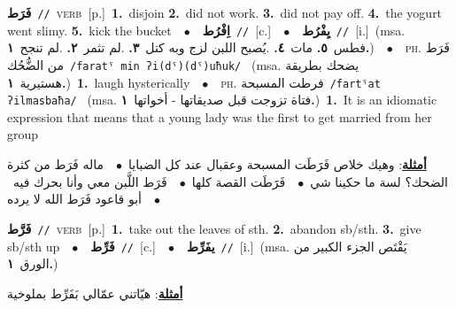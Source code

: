\documentclass[10pt,a4paper,twoside]{article} %
\begin{document}
\begin{multicols}{2}
{\setlength\topsep{0pt}\textbf{\foreignlanguage{arabic}{فَرَط}}\ {\color{gray}\texttt{//}\color{black}}\ \textsc{verb}\ [p.]\ \textbf{1.}~disjoin  \textbf{2.}~did not work.  \textbf{3.}~did not pay off.  \textbf{4.}~the yogurt went slimy.  \textbf{5.}~kick the bucket\ \ $\bullet$\ \ \setlength\topsep{0pt}\textbf{\foreignlanguage{arabic}{اِفْرُط}}\ {\color{gray}\texttt{//}\color{black}}\ [c.]\ \ $\bullet$\ \ \setlength\topsep{0pt}\textbf{\foreignlanguage{arabic}{يِفْرُط}}\ {\color{gray}\texttt{//}\color{black}}\ [i.]\ \color{gray}(msa. \foreignlanguage{arabic}{فطس}~\foreignlanguage{arabic}{\textbf{٥.}}  \foreignlanguage{arabic}{مات}~\foreignlanguage{arabic}{\textbf{٤.}}  .\foreignlanguage{arabic}{يُصبح اللبن لزج وبه كتل}~\foreignlanguage{arabic}{\textbf{٣.}}  .\foreignlanguage{arabic}{لم تثمر}~\foreignlanguage{arabic}{\textbf{٢.}}  .\foreignlanguage{arabic}{لم تنجح}~\foreignlanguage{arabic}{\textbf{١.}})\color{black}\ \ $\bullet$\ \ \textsc{ph.} \color{gray} \foreignlanguage{arabic}{فَرَط من الضُّحُك}\color{black}\ {\color{gray}\texttt{/{\sffamily faratˤ min ʔi(dˤ)(dˤ)uħuk}/}\color{black}}\ \color{gray} (msa. \foreignlanguage{arabic}{يضحك بطريقة هستيرية}~\foreignlanguage{arabic}{\textbf{١.}})\color{black}\ \textbf{1.}~laugh hysterically\ \ $\bullet$\ \ \textsc{ph.} \color{gray} \foreignlanguage{arabic}{فرطت المسبحة}\color{black}\ {\color{gray}\texttt{/{\sffamily fartˤat ʔilmasbaħa}/}\color{black}}\ \color{gray} (msa. \foreignlanguage{arabic}{فتاة تزوجت قبل صديقاتها - أخواتها}~\foreignlanguage{arabic}{\textbf{١.}})\color{black}\ \textbf{1.}~It is an idiomatic expression that means that a young lady was the first to get married from her group\  \begin{flushright}\color{gray}\foreignlanguage{arabic}{\textbf{\underline{\foreignlanguage{arabic}{أمثلة}}}: وهيك خلاص فَرََطَت المسبحة وعقبال عند كل الضبايا\ $\bullet$\ \  ماله فَرَط من كثرة الضحك؟ لسة ما حكينا شي\ $\bullet$\ \  فَرََطَت القصة كلها\ $\bullet$\ \  فَرَط اللَّبن معي وأنا بحرك فيه\ $\bullet$\ \  أبو قاعود فَرَط الله لا يرده}\end{flushright}\color{black}} \vspace{2mm}

{\setlength\topsep{0pt}\textbf{\foreignlanguage{arabic}{فَرَّط}}\ {\color{gray}\texttt{//}\color{black}}\ \textsc{verb}\ [p.]\ \textbf{1.}~take out the leaves of sth.  \textbf{2.}~abandon sb/sth.  \textbf{3.}~give sb/sth up\ \ $\bullet$\ \ \setlength\topsep{0pt}\textbf{\foreignlanguage{arabic}{فَرِّط}}\ {\color{gray}\texttt{//}\color{black}}\ [c.]\ \ $\bullet$\ \ \setlength\topsep{0pt}\textbf{\foreignlanguage{arabic}{يفَرِّط}}\ {\color{gray}\texttt{//}\color{black}}\ [i.]\ \color{gray}(msa. \foreignlanguage{arabic}{يَقْتَص الجزء الكبير من الورق}~\foreignlanguage{arabic}{\textbf{١.}})\color{black}\  \begin{flushright}\color{gray}\foreignlanguage{arabic}{\textbf{\underline{\foreignlanguage{arabic}{أمثلة}}}: هيّاتني عمّالي بَفَرِّط بملوخية}\end{flushright}\color{black}} \vspace{2mm}


\end{multicols}
\end{document}
